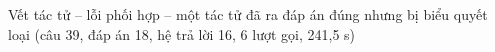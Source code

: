\begin{vetsuyluan}{Vết tác tử -- lỗi phối hợp -- một tác tử đã ra đáp án đúng nhưng bị biểu quyết loại (câu 39, đáp án 18, hệ trả lời 16, 6 lượt gọi, 241{,}5 s)}
\end{vetsuyluan}
